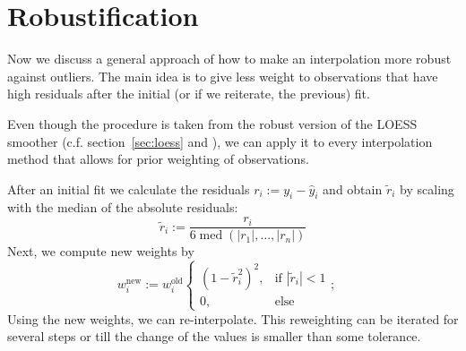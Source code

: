 \section{Robustification}{
	\label{sec:loess_robustify}
	{ %
		Now we discuss a general approach of how to make an interpolation more robust against outliers. The main idea is to give less weight to observations that have high residuals after the initial (or if we reiterate, the previous) fit.

		Even though the procedure is taken from the robust version of the LOESS smoother (c.f. section~\ref{sec:loess} and \cite{clevelandRobustLocallyWeighted1979}), we can apply it to every interpolation method that allows for prior weighting of observations.
	}
	
	{	
		After an initial fit we calculate the residuals $r_i := y_i - \hat y_i$ and obtain $\tilde r_i$ by scaling with the median of the absolute residuals: 
		\begin{equation}
			\tilde r_i := \frac{r_i}{6\operatorname{med}\left(|r_1|,\dots,|r_n|\right)}
		\end{equation}
		Next, we compute new weights by
		\begin{equation}
			w_i^\text{new}:=w_i^\text{old} \begin{cases}
				\left(1-\tilde r_i^{2}\right)^{2}, & \text{if } |\tilde r_i|<1 \\
				0,                        & \text{else }
			\end{cases};\quad
			\label{eq:bisquare}
		\end{equation}
		Using the new weights, we can re-interpolate. This reweighting can be iterated for several steps or till the change of the values is smaller than some tolerance.

	}

}
